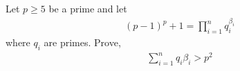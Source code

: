 Let $p \geq 5$ be a prime and let
\begin{align*} (p-1)^p +1 = \prod _{i=1}^n q_i^{\beta_i} \end{align*}where $q_i$ are primes. Prove,
\begin{align*} \sum_{i=1}^n q_i \beta_i >p^2 \end{align*}